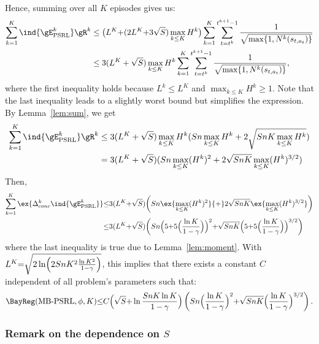 \begin{subappendices}
\begin{align}
\end{align}
Hence, summing over all $K$ episodes gives us:
\begin{align}
    \sum_{k=1}^{K} \ind{\gE^{k}_\text{PSRL}}\gR^k
    &\le  \big(L^K {+}(2L^K {+}3\sqrt{S})\max_{k\le K}H^k\big)\sum_{k=1}^K \sum_{t=t^k}^{t^{k+1}-1}\frac1{\sqrt{\max\{1,N^{k}(s_{t,a_t})\} }}
    \nonumber\\
    &\le  3(L^K+\sqrt{S})\max_{k\le K}H^k \sum_{k=1}^K \sum_{t=t^k}^{t^{k+1}-1}\frac1{\sqrt{\max\{1,N^{k}(s_{t,a_t})\} }},
    \label{eq:sum_not_E_k}
\end{align}
where the first inequality holds because $L^k\le L^K$ and $\max_{k\le K}H^k\ge1$. Note that the last inequality leads to a slightly worst bound but simplifies the expression. By Lemma~\ref{lem:sum}, we get
\begin{align*}
    \sum_{k=1}^{K} \ind{\gE^{k}_\text{PSRL}}\gR^k
    &\le 3(L^K+\sqrt{S})\max_{k\le K}H^k(Sn\max_{k\le K}H^k +2\sqrt{SnK \max_{k\le K}H^k}) \\
    &=3(L^K+\sqrt{S})(Sn\max_{k\le K}(H^k)^2 +2\sqrt{SnK} \max_{k\le K}(H^k)^{3/2})
    \nonumber
\end{align*}
Then, 
\begin{align}
    \sum_{k=1}^K\ex{\Delta^k_{conc} \ind{\gE^{k}_\text{PSRL}}}
    &{\le} 3(L^K {+}\sqrt{S})\bigg(Sn\ex{\max_{k\le K}(H^k)^2} {+}2\sqrt{SnK} \ex{\max_{k\le K}(H^k)^{3/2}}\bigg) \label{eq:proof_bound}\\
    &{\le} 3(L^K {+}\sqrt{S})\bigg(Sn\Bigl(5 {+}5\Bigl(\frac{\ln K}{1-\gamma}\Bigr)\Bigr)^2 {+}\sqrt{SnK}\Bigl(5 {+}5\Bigl(\frac{\ln K}{1-\gamma}\Bigr)\Bigr)^{3/2}\bigg) \nonumber
\end{align}
where the last inequality is true due to Lemma~\ref{lem:moment}.
With $L^K{=}\sqrt{2\ln\Bigl(2SnK^2\frac{\ln K^2}{1-\gamma}\Bigr)}$, this implies that there exists a constant $C$ independent of all problem's parameters such that:
\begin{align*}
    \BayReg(\textnormal{MB-PSRL},\phi,K) {\le} C\Bigl(\sqrt{S}{+}\ln \frac{SnK\ln K}{1-\gamma}\Bigr) \left(Sn\Bigl(\frac{\ln K}{1-\gamma}\Bigr)^{2}
    {+}\sqrt{SnK}\Bigl(\frac{\ln K}{1-\gamma}\Bigr)^{3/2}\right).
\end{align*}

\subsubsection{Remark on the dependence on $S$}
\label{sssec:psrl_s}


\end{subappendices}
